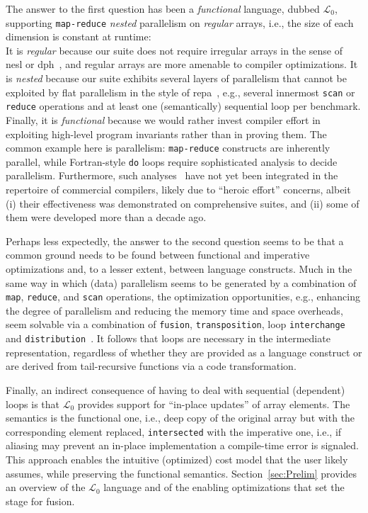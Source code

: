 \documentclass{sigplanconf}  %
\newcommand{\LO}{$\mathcal{L}_0$}
\begin{document}
The answer to the first question has been %
a {\em functional} language, dubbed \LO{}, supporting %
\texttt{map-reduce} {\em nested} parallelism on {\em regular} arrays, i.e., 
the size of each dimension is constant at runtime:\\
It is {\em regular} because our suite does not require irregular 
arrays in the sense of {\sc nesl} or {\sc dph}~\cite{BlellochCACM96NESL,Chak06DPH}, 
and regular arrays are more amenable to compiler optimizations.
%
It is {\em nested} because our suite exhibits several layers of 
parallelism that cannot be exploited by flat parallelism in the style of 
{\sc repa}~\cite{keller2010regular}, e.g., several innermost {\tt scan} or 
{\tt reduce} operations and at least one (semantically)
sequential loop per benchmark.
%
Finally, it is {\em functional} because we would rather invest compiler effort
in exploiting high-level program invariants rather than in proving them.
The common example here is parallelism: {\tt map-reduce} 
constructs are inherently parallel, while Fortran-style \texttt{do} 
loops require sophisticated analysis to decide parallelism. 
Furthermore, such analyses~\cite{Blume94RangeTest,SUIF,CosPLDI,SummaryMonot} 
have not yet been integrated in the repertoire of commercial compilers,
likely due to ``heroic effort'' concerns, albeit
 (i) their effectiveness was demonstrated on comprehensive suites, and
(ii) some of them were developed more than a decade ago.

Perhaps less expectedly, the answer to the second question seems to be 
that a common ground needs to be found between functional and imperative
optimizations and, to a lesser extent,  between language constructs.
Much in the same way in which (data) parallelism seems to be generated by
a combination of {\tt map}, {\tt reduce}, and {\tt scan} operations, 
the optimization opportunities, e.g., enhancing the degree of parallelism 
and reducing  the memory time and space overheads, seem solvable via a 
combination of {\tt fusion}, {\tt transposition}, loop {\tt interchange} 
and {\tt distribution}~\cite{OptCompModernArch}.
%
It follows that loops are necessary in the intermediate representation,
regardless of whether they are provided as a language construct or are
derived from tail-recursive functions via a code transformation. 

Finally, an indirect consequence of having to deal with sequential (dependent) 
loops is that \LO{} provides support for ``in-place updates'' of 
array elements. The semantics is the functional one, i.e., %
deep copy of the original array but with the corresponding element replaced,
\texttt{intersected} with the imperative one, i.e., if aliasing may prevent 
an in-place implementation a compile-time error is signaled.   This approach
enables the intuitive (optimized) cost model that the user likely assumes, 
while preserving the functional semantics. 
%
Section~\ref{sec:Prelim} provides an overview of the \LO{} language %
and of the enabling optimizations that set the stage for fusion. 
\end{document}
